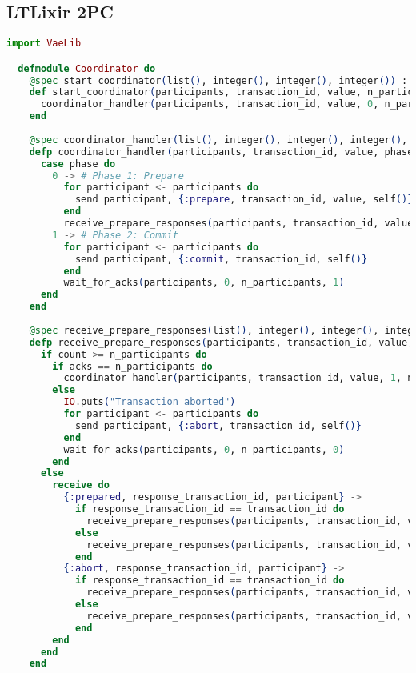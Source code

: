 \subsection{LTLixir 2PC}
\begin{lstlisting}[language=Elixir, xleftmargin=.1\linewidth]
  import VaeLib

  defmodule Coordinator do
    @spec start_coordinator(list(), integer(), integer(), integer()) :: :ok
    def start_coordinator(participants, transaction_id, value, n_participants) do
      coordinator_handler(participants, transaction_id, value, 0, n_participants)
    end
  
    @spec coordinator_handler(list(), integer(), integer(), integer(), integer()) :: :ok
    defp coordinator_handler(participants, transaction_id, value, phase, n_participants) do
      case phase do
        0 -> # Phase 1: Prepare
          for participant <- participants do
            send participant, {:prepare, transaction_id, value, self()}
          end
          receive_prepare_responses(participants, transaction_id, value, 0, 0, n_participants)
        1 -> # Phase 2: Commit
          for participant <- participants do
            send participant, {:commit, transaction_id, self()}
          end
          wait_for_acks(participants, 0, n_participants, 1)
      end
    end
  
    @spec receive_prepare_responses(list(), integer(), integer(), integer(), integer(), integer()) :: :ok
    defp receive_prepare_responses(participants, transaction_id, value, count, acks, n_participants) do
      if count >= n_participants do
        if acks == n_participants do
          coordinator_handler(participants, transaction_id, value, 1, n_participants)
        else
          IO.puts("Transaction aborted")
          for participant <- participants do
            send participant, {:abort, transaction_id, self()}
          end
          wait_for_acks(participants, 0, n_participants, 0)
        end
      else
        receive do
          {:prepared, response_transaction_id, participant} ->
            if response_transaction_id == transaction_id do
              receive_prepare_responses(participants, transaction_id, value, count + 1, acks + 1, n_participants)
            else
              receive_prepare_responses(participants, transaction_id, value, count, acks, n_participants)
            end
          {:abort, response_transaction_id, participant} ->
            if response_transaction_id == transaction_id do
              receive_prepare_responses(participants, transaction_id, value, count + 1, acks, n_participants)
            else
              receive_prepare_responses(participants, transaction_id, value, count, acks, n_participants)
            end
        end
      end
    end
  

\end{lstlisting}
